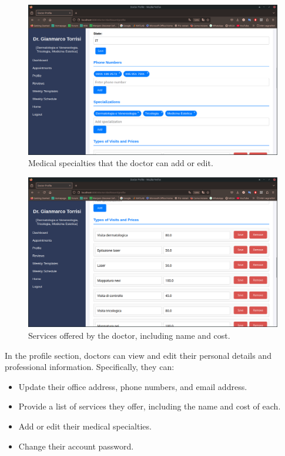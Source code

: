 \begin{figure}[!h]
    \centering
    \includegraphics[scale=0.30]{resources/screenshots/doctor_ui/specializations.png}
    \caption{Medical specialties that the doctor can add or edit.}
    \label{fig:doctor_specialties}
\end{figure}

\begin{figure}[!h]
    \centering
    \includegraphics[scale=0.30]{resources/screenshots/doctor_ui/services.png}
    \caption{Services offered by the doctor, including name and cost.}
    \label{fig:doctor_services}
\end{figure}

In the profile section, doctors can view and edit their personal details and professional information. Specifically, they can:
\begin{itemize}
    \item Update their office address, phone numbers, and email address.
    \item Provide a list of services they offer, including the name and cost of each.
    \item Add or edit their medical specialties.
    \item Change their account password.
\end{itemize}

